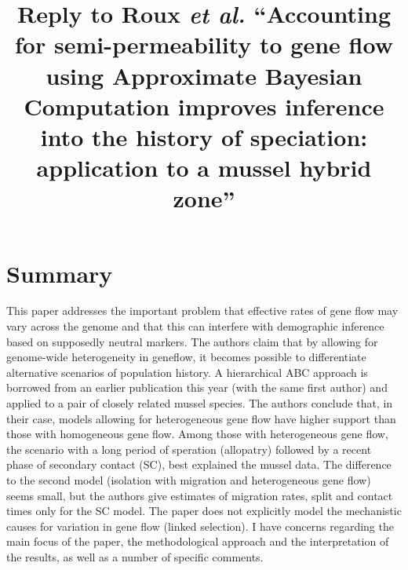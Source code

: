 \documentclass[11pt]{article}
\title{Reply to Roux \emph{et al.} ``Accounting for semi-permeability to gene flow using Approximate Bayesian Computation improves inference into the history of speciation: application to a mussel hybrid zone''}
\begin{document}
\maketitle

\section{Summary}
This paper addresses the important problem that effective rates of gene flow may vary across the genome and that this can interfere with demographic inference based on supposedly neutral markers. The authors claim that by allowing for genome-wide heterogeneity in geneflow, it becomes possible to differentiate alternative scenarios of population history. A hierarchical ABC approach is borrowed from an earlier publication this year (with the same first author) and applied to a pair of closely related mussel species. The authors conclude that, in their case, models allowing for heterogeneous gene flow have higher support than those with homogeneous gene flow. Among those with heterogeneous gene flow, the scenario with a long period of speration (allopatry) followed by a recent phase of secondary contact (SC), best explained the mussel data. The difference to the second model (isolation with migration and heterogeneous gene flow) seems small, but the authors give estimates of migration rates, split and contact times only for the SC model. The paper does not explicitly model the mechanistic causes for variation in gene flow (linked selection). I have concerns regarding the main focus of the paper, the methodological approach and the interpretation of the results, as well as a number of specific comments. 
\end{document}
